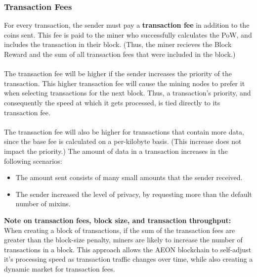 \subsubsection{Transaction Fees}
For every transaction, the sender must pay a \textbf{transaction fee} in addition to the coins sent. This fee is paid to the miner who successfully calculates the PoW, and includes the transaction in their block. (Thus, the miner recieves the Block Reward and the sum of all transaction fees that were included in the block.)\\
\\
The transaction fee will be higher if the sender increases the priority of the transaction. This higher transaction fee will cause the mining nodes to prefer it when selecting transactions for the next block. Thus, a transaction's priority, and consequently the speed at which it gets processed, is tied directly to its transaction fee.\\
\\
The transaction fee will also be higher for transactions that contain more data, since the base fee is calculated on a per-kilobyte basis. (This increase does not impact the priority.) The amount of data in a transaction increases in the following scenarios: 
\begin{itemize}
	\item The amount sent consists of many small amounts that the sender received.
	\item The sender increased the level of privacy, by requesting more than the default number of mixins.
\end{itemize}
\textbf{Note on transaction fees, block size, and transaction throughput:}\\
When creating a block of transactions, if the sum of the transaction fees are greater than the block-size penalty, miners are likely to increase the number of transactions in a block. This approach allows the AEON blockchain to self-adjust it's processing speed as transaction traffic changes over time, while also creating a dynamic market for transaction fees.\\
\\




